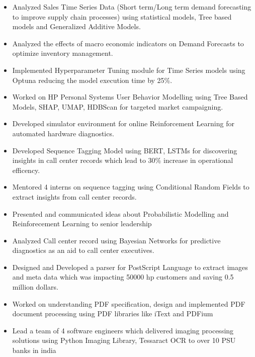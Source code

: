 \documentclass[10pt,a4paper,ragged2e,withhyper]{altacv}
\begin{document}
\begin{paracol}{1}
\par\divider
{}

\begin{itemize}
\item Analyzed Sales Time Series Data (Short term/Long term demand forecasting to
improve supply chain processes) using statistical models, Tree based models
and Generalized Additive Models.
\item Analyzed the effects of macro economic indicators on Demand Forecasts to
optimize inventory management.
\item Implemented Hyperparameter Tuning module for Time Series models using Optuna
reducing the model execution time by 25\%.
\item Worked on HP Personal Systems User Behavior Modelling using Tree Based Models,
SHAP, UMAP, HDBScan for targeted market campaigning.
\item Developed simulator environment for online Reinforcement Learning for
automated hardware diagnostics.
\item Developed Sequence Tagging Model using BERT, LSTMs for discovering insights in
call center records which lead to 30\% increase in operational efficency.
\item Mentored 4 interns on sequence tagging using Conditional Random Fields to
extract insights from call center records.
\item Presented and communicated ideas about Probabilistic Modelling and
Reinforecement Learning to senior leadership
\item Analyzed Call center record using Bayesian Networks for predictive diagnostics
as an aid to call center executives.
\end{itemize}


\par\divider
{}
\begin{itemize}
\item Designed and Developed a parser for PostScript Language to extract images and
meta data which was impacting 50000 hp customers and saving 0.5 million dollars.
\item Worked on understanding PDF specification, design and implemented PDF document
processing using PDF libraries like iText and PDFium
\item Lead a team of 4 software engineers which delivered imaging processing solutions using
Python Imaging Library, Tessaract OCR to over 10 PSU banks in india
\end{itemize}


\end{paracol}
\end{document}
